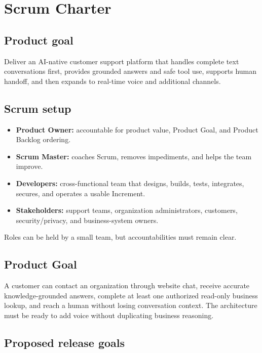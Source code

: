 \chapter{Scrum Charter}

\section{Product goal}

Deliver an AI-native customer support platform that handles complete text conversations first, provides grounded answers and safe tool use, supports human handoff, and then expands to real-time voice and additional channels.

\section{Scrum setup}

\begin{itemize}
\item \textbf{Product Owner:} accountable for product value, Product Goal, and Product Backlog ordering.
\item \textbf{Scrum Master:} coaches Scrum, removes impediments, and helps the team improve.
\item \textbf{Developers:} cross-functional team that designs, builds, tests, integrates, secures, and operates a usable Increment.
\item \textbf{Stakeholders:} support teams, organization administrators, customers, security/privacy, and business-system owners.
\end{itemize}
Roles can be held by a small team, but accountabilities must remain clear.



\section{Product Goal}

A customer can contact an organization through website chat, receive accurate knowledge-grounded answers, complete at least one authorized read-only business lookup, and reach a human without losing conversation context. The architecture must be ready to add voice without duplicating business reasoning.

\section{Proposed release goals}

